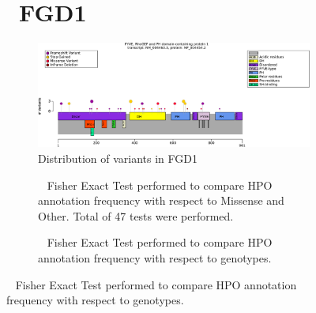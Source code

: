 \begin{figure}[htbp]
    \section*{ FGD1}
    \centering
    \begin{subfigure}[b]{0.95\textwidth}
    \centering
    \includegraphics[width=\textwidth]{ img/FGD1_protein_diagram.pdf} 
    \captionsetup{justification=raggedright,singlelinecheck=false}
    \caption{Distribution of variants in FGD1}
    \end{subfigure}
    
    \vspace{2em}
    
    \begin{subfigure}[b]{0.95\textwidth}
    \centering
    \captionsetup{justification=raggedright,singlelinecheck=false}
    \caption{         Fisher Exact Test performed to compare HPO annotation frequency with respect to Missense and Other. Total of
            47 tests were performed. }
    \end{subfigure}
    \vspace{2em}
    \begin{subfigure}[b]{0.95\textwidth}
    \centering
    \captionsetup{justification=raggedright,singlelinecheck=false}
    \caption{             Fisher Exact Test performed to compare HPO annotation frequency with respect to genotypes. }
    \end{subfigure}
    

\end{figure}
